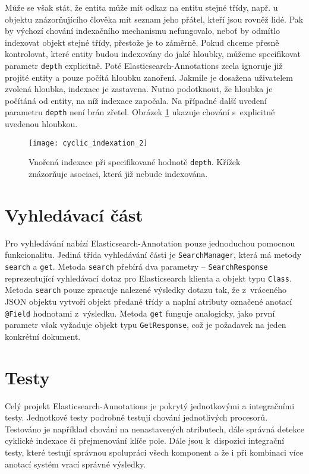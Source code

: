 \documentclass[11pt,oneside]{fithesis2}
\begin{document}
Může se však stát, že entita může mít odkaz na entitu stejné třídy, např. u objektu znázorňujícího člověka mít seznam jeho přátel, kteří jsou rovněž lidé. Pak by výchozí chování indexačního mechanismu nefungovalo, neboť by odmítlo indexovat objekt stejné třídy, přestože je to záměrně. Pokud chceme přesně kontrolovat, které entity budou indexovány do jaké hloubky, můžeme specifikovat parametr \texttt{depth} explicitně. Poté Elasticsearch-Annotations zcela ignoruje již projité entity a pouze počítá hloubku zanoření. Jakmile je dosažena uživatelem zvolená hloubka, indexace je zastavena. Nutno podotknout, že hloubka je počítáná od entity, na níž indexace započala. Na případné další uvedení parametru \texttt{depth}  není brán zřetel. Obrázek \ref{CyclicIndexation2} ukazuje chování s~explicitně uvedenou hloubkou.

\begin{figure}[htb]
	\begin{center}
		\texttt{[image: cyclic\_indexation\_2]}
	\end{center}
	\caption{Vnořená indexace při specifikované hodnotě \texttt{depth}.  Křížek znázorňuje asociaci, která již nebude indexována.}	
	\label{CyclicIndexation2}
\end{figure}

\section{Vyhledávací část}
Pro vyhledávání nabízí Elasticsearch-Annotation pouze jednoduchou pomocnou funkcionalitu. Jediná třída vyhledávání části je \texttt{SearchManager}, která má metody \texttt{search} a \texttt{get}. Metoda \texttt{search} přebírá dva parametry -- \texttt{SearchResponse} reprezentující vyhledávací dotaz pro Elasticsearch klienta a objekt typu \texttt{Class}. Metoda \texttt{search} pouze zpracuje nalezené výsledky dotazu tak, že z~vráceného JSON objektu vytvoří objekt předané třídy a naplní atributy označené anotací \texttt{@Field} hodnotami z~výsledku. Metoda \texttt{get} funguje analogicky, jako první parametr však vyžaduje objekt typu \texttt{GetResponse}, což je požadavek na jeden konkrétní dokument.

\section{Testy}
\label{ElasticsearchAnnotationsTesty}
Celý projekt Elasticsearch-Annotations je pokrytý jednotkovými a integračními testy. Jednotkové testy podrobně testují chování jednotlivých procesorů. Testováno je například chování na nenastavených atributech, dále správná detekce cyklické indexace či přejmenování klíče pole. Dále jsou k~dispozici integrační testy, které testují správnou spolupráci všech komponent a že i při kombinaci více anotací systém vrací správné výsledky. 
\end{document}
